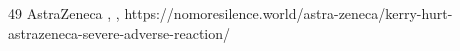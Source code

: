           {}
          {49}
          {AstraZeneca}
          {}
          {
            ,
            ,
          }
          {https://nomoresilence.world/astra-zeneca/kerry-hurt-astrazeneca-severe-adverse-reaction/}

